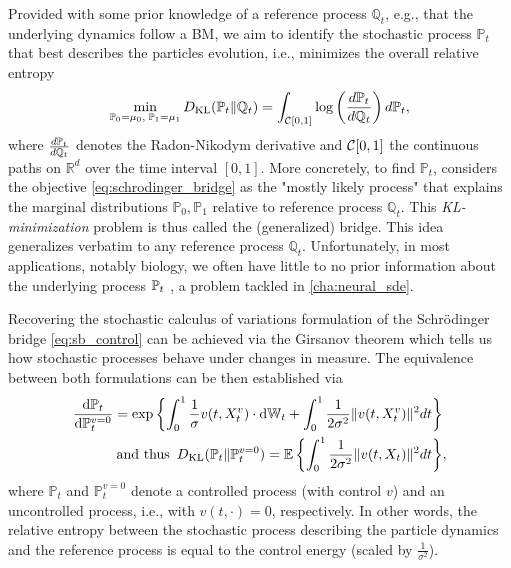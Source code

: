 Provided with some prior knowledge of a reference process $\mathbb{Q}_t$, e.g., that the underlying dynamics follow a \acrfull{BM}, we aim to identify the stochastic process $\mathbb{P}_t$ that best describes the particles evolution, i.e., minimizes the overall relative entropy
\begin{equation}
	\label{eq:schrodinger_bridge}
	\min_{ \substack{ \mathbb{P}_{{0}} = \mu_0, \; \mathbb{P}_{{1}} = \mu_1} } D_{\mathrm{KL}}(\mathbb{P}_{{t}} \| \mathbb{Q}_{ t }) = \int_{{\mathcal{C}}[0,1]} \log \left( \frac{d\mathbb{P}_{{t}}}{d \mathbb{Q}_{ t }} \right) d\mathbb{P}_{{t}},
\end{equation}
where $\frac{d\mathbb{P}_{{t}}}{d\mathbb{Q}_{ t }}$ denotes the Radon-Nikodym derivative and ${\mathcal{C}}[0,1]$ the continuous paths on $\mathbb{R}^d$ over the time interval $[0, 1]$.
More concretely, to find $\mathbb{P}_t$, \citet{schrodinger1931umkehrung, schrodinger1932theorie} considers the objective \eqref{eq:schrodinger_bridge} as the "mostly likely process" that explains the marginal distributions $\mathbb{P}_0, \mathbb{P}_1$ relative to reference process $\mathbb{Q}_t$.
This \emph{KL-minimization} problem is thus called the (generalized) \citeauthor{schrodinger1931umkehrung} bridge.
This idea generalizes verbatim to any reference process $\mathbb{Q}_t$. Unfortunately, in most applications, notably biology, we often have little to no prior information about the underlying process $\mathbb{P}_{{t}}$ \citep{liberali2014hierarchical}, a problem tackled in \cref{cha:neural_sde}.

Recovering the stochastic calculus of variations formulation of the Schr{\"o}dinger bridge \eqref{eq:sb_control} can be achieved via the Girsanov theorem which tells us how stochastic processes behave under changes in measure. The equivalence between both formulations can be then established via
\begin{align*}
	\frac{\mathrm{d}\mathbb{P}_{t}}{\mathrm{d} \mathbb{P}^{v=0}_t} = \exp \left\{ \int_0^1 \frac{1}{\sigma} v(t, X_t^v) \cdot \mathrm{d} \mathbb{W}_t +  \int_0^1 \frac{1}{2\sigma^2} \lVert v(t, X_t^v)\rVert^2 dt \right\}& \\
	\text{and thus} \enspace D_{\mathrm{KL}}(\mathbb{P}_{t} \| \mathbb{P}^{v=0}_t) = \mathbb{E} \left\{ \int_0^1 \frac{1}{2\sigma^2}\lVert v(t, X_t)\rVert^2 dt \right\}& ,
\end{align*}
where $\mathbb{P}_t$ and $\mathbb{P}^{v=0}_t$ denote a controlled process (with control $v$) and an uncontrolled process, i.e., with $v(t, \cdot)=0$, respectively.
In other words, the relative entropy between the stochastic process describing the particle dynamics and the reference process is equal to the control energy (scaled by $\frac{1}{\sigma^2}$).


